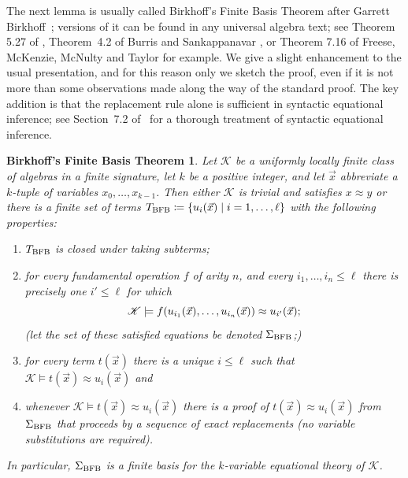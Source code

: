 \documentclass[10pt,a4paper]{amsart}
\theoremstyle{plain}
\newtheorem{BFBT}[thm]{Birkhoff's Finite Basis Theorem}
\theoremstyle{definition}
\newcommand{\up}[1]{\textup{#1}}
\begin{document}
The next lemma is usually called Birkhoff's Finite Basis Theorem after Garrett Birkhoff~\cite{bir}; versions of it can be found in any universal algebra text; see Theorem 5.27 of \cite{ber}, Theorem~4.2 of Burris and Sankappanavar \cite{bursan}, or Theorem 7.16 of Freese, McKenzie, McNulty and Taylor \cite{ALV} for example.   We give a slight enhancement to the usual presentation, and for this reason only we sketch the proof, even if it is not more than some observations made along the way of the standard proof.  The key addition is that the replacement rule alone is sufficient in syntactic equational inference; see Section~7.2 of~\cite{ALV} for a thorough treatment of syntactic equational inference.
\begin{BFBT}\label{BFBT}
Let $\mathscr{K}$ be a uniformly locally finite class of algebras in a finite signature, let $k$ be a positive integer, and let $\vec{x}$ abbreviate a $k$-tuple of variables $x_0,\dots,x_{k-1}$.  Then  either $\mathscr{K}$ is trivial and satisfies $x\approx y$ or there is a finite set of terms 
$
T_{\rm BFB}\coloneqq \{u_i(\vec{x})\mid i=1,\dots,\ell\}
$
with the following properties\up:
 \begin{enumerate}
 \item $T_{\rm BFB}$ is closed under taking subterms\up;
 \item for every fundamental operation $f$ of arity $n$, and every $i_1,\dots,i_n\leq 
 \ell$ there is precisely one $i'\leq\ell$ for which 
 \[
 \mathscr{K}\models f(u_{i_1}(\vec{x}),\dots,u_{i_n}(\vec{x}))\approx u_{i'}(\vec{x})\up;
 \]
\up(let the set of these satisfied equations be denoted $\Sigma_{\rm BFB}$\up;\up)
  \item for every term $t(\vec{x})$ there is a unique $i\leq \ell$ such that $\mathscr{K}\models t(\vec{x})\approx u_{i}(\vec{x})$ and 
  \item whenever $\mathscr{K}\models t(\vec{x})\approx u_{i}(\vec{x})$ there is a proof of $t(\vec{x})\approx u_{i}(\vec{x})$ from $\Sigma_{\rm BFB}$ that proceeds by a sequence of exact replacements \up(no variable substitutions are required\up).
 \end{enumerate}
 In particular, $\Sigma_{\rm BFB}$ is a finite basis for the $k$-variable equational theory of $\mathscr{K}$.
\end{BFBT}
\end{document}
